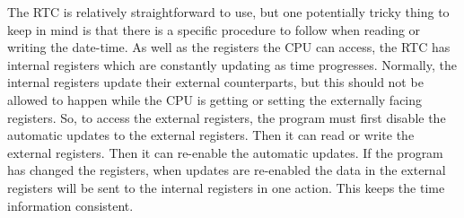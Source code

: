 The RTC is relatively straightforward to use, but one potentially tricky thing to keep in mind is that there is a specific procedure to follow when reading or writing the date-time. As well as the registers the CPU can access, the RTC has internal registers which are constantly updating as time progresses. Normally, the internal registers update their external counterparts, but this should not be allowed to happen while the CPU is getting or setting the externally facing registers. So, to access the external registers, the program must first disable the automatic updates to the external registers. Then it can read or write the external registers. Then it can re-enable the automatic updates. If the program has changed the registers, when updates are re-enabled the data in the external registers will be sent to the internal registers in one action. This keeps the time information consistent.

